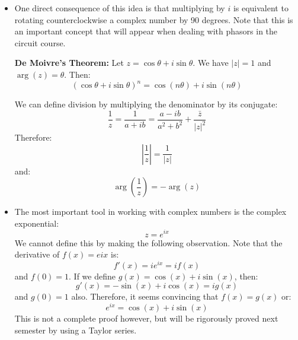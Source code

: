 \documentclass{article}
\let\oldtextbf\textbf
\renewcommand{\textbf}[1]{\oldtextbf{#1}\index{#1}}
\begin{document}
\begin{itemize}
\begin{idea}
    \end{idea}
    \item One direct consequence of this idea is that multiplying by $i$ is equivalent to rotating counterclockwise a complex number by 90 degrees. Note that this is an important concept that will appear when dealing with phasors in the circuit course.
    \begin{theorem}
        \textbf{De Moivre's Theorem:} Let $z=\cos\theta+i\sin\theta$. We have $|z|=1$ and $\arg(z)=\theta$. Then:
        \begin{equation}
            (\cos\theta+i\sin\theta)^n = \cos(n\theta)+i\sin(n\theta)
        \end{equation}
    \end{theorem}
    \begin{definition}
        We can define division by multiplying the denominator by its conjugate:
        \begin{equation}
            \frac{1}{z} = \frac{1}{a+ib} = \frac{a-ib}{a^2+b^2} + \frac{\bar{z}}{|z|^2}
            \label{eq:}
        \end{equation}
        Therefore:
        \begin{equation}
            \left|\frac{1}{z}\right| = \frac{1}{|z|}
            \label{eq:}
        \end{equation}
        and:
        \begin{equation}
            \arg\left(\frac{1}{z}\right) = - \arg(z)
            \label{eq:}
        \end{equation}
    \end{definition}
    \item The most important tool in working with complex numbers is the complex exponential:
    \begin{equation}
        z = e^{ix}
        \label{eq:}
    \end{equation}
    We cannot define this by making the following observation. Note that the derivative of $f(x)=e{ix}$ is:
    \begin{equation}
        f'(x) = ie^{ix} = if(x)
        \label{eq:}
    \end{equation}
    and $f(0)=1$. If we define $g(x)=\cos(x)+i\sin(x)$, then:
    \begin{equation}
        g'(x) = -\sin(x)+i\cos(x) = ig(x)
        \label{eq:}
    \end{equation}
    and $g(0)=1$ also. Therefore, it seems convincing that $f(x)=g(x)$ or:
    \begin{equation}
        e^{ix} = \cos(x)+i\sin(x)
        \label{eq:}
    \end{equation}
    This is not a complete proof however, but will be rigorously proved next semester by using a Taylor series.
\end{itemize}
\end{document}
